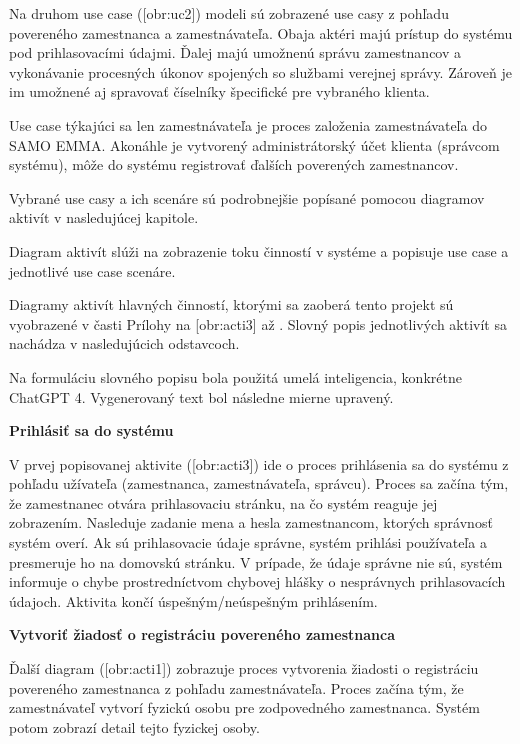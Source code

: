 Na druhom use case ([obr:uc2]) modeli sú zobrazené use casy z pohľadu povereného zamestnanca a zamestnávateľa. Obaja aktéri majú prístup do systému pod prihlasovacími údajmi. Ďalej majú umožnenú správu zamestnancov a vykonávanie procesných úkonov spojených so službami verejnej správy. Zároveň je im umožnené aj spravovať číselníky špecifické pre vybraného klienta.

Use case týkajúci sa len zamestnávateľa je proces založenia zamestnávateľa do SAMO EMMA. Akonáhle je vytvorený administrátorský účet klienta (správcom systému), môže do systému registrovať ďalších poverených zamestnancov.

Vybrané use casy a ich scenáre sú podrobnejšie popísané pomocou diagramov aktivít v nasledujúcej kapitole.


Diagram aktivít slúži na zobrazenie toku činností v systéme a popisuje use case a jednotlivé use case scenáre.

Diagramy aktivít hlavných činností, ktorými sa zaoberá tento projekt sú vyobrazené v časti Prílohy na [obr:acti3] až . Slovný popis jednotlivých aktivít sa nachádza v nasledujúcich odstavcoch.

Na formuláciu slovného popisu bola použitá umelá inteligencia, konkrétne ChatGPT 4. Vygenerovaný text bol následne mierne upravený.

\zlom
\start
\setupindenting[no]
\start \bf Prihlásiť sa do systému\stop
\stop

V prvej popisovanej aktivite ([obr:acti3]) ide o proces prihlásenia sa do systému z pohľadu užívateľa (zamestnanca, zamestnávateľa, správcu). Proces sa začína tým, že zamestnanec otvára prihlasovaciu stránku, na čo systém reaguje jej zobrazením. Nasleduje zadanie mena a hesla zamestnancom, ktorých správnosť systém overí. Ak sú prihlasovacie údaje správne, systém prihlási používateľa a presmeruje ho na domovskú stránku. V prípade, že údaje správne nie sú, systém informuje o chybe prostredníctvom chybovej hlášky o nesprávnych prihlasovacích údajoch. Aktivita končí úspešným/neúspešným prihlásením.


\blank
\start
\setupindenting[no]
\start\bf Vytvoriť žiadosť o registráciu povereného zamestnanca\stop
\stop

Ďalší diagram ([obr:acti1]) zobrazuje proces vytvorenia žiadosti o registráciu povereného zamestnanca z pohľadu zamestnávateľa. Proces začína tým, že zamestnávateľ vytvorí fyzickú osobu pre zodpovedného zamestnanca. Systém potom zobrazí detail tejto fyzickej osoby. 

